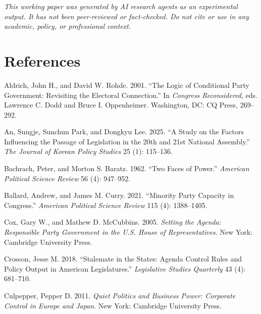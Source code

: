 \documentclass[11pt]{article}
\begin{document}
\bigskip
\noindent\textit{This working paper was generated by AI research agents as an
experimental output. It has not been peer-reviewed or fact-checked.
Do not cite or use in any academic, policy, or professional context.}


\section*{References}

\begin{description}

\item Aldrich, John H., and David W. Rohde. 2001. ``The Logic of Conditional Party Government: Revisiting the Electoral Connection.'' In \textit{Congress Reconsidered}, eds. Lawrence C. Dodd and Bruce I. Oppenheimer. Washington, DC: CQ Press, 269--292.

\item An, Sungje, Sunchun Park, and Dongkyu Lee. 2025. ``A Study on the Factors Influencing the Passage of Legislation in the 20th and 21st National Assembly.'' \textit{The Journal of Korean Policy Studies} 25 (1): 115--136.

\item Bachrach, Peter, and Morton S. Baratz. 1962. ``Two Faces of Power.'' \textit{American Political Science Review} 56 (4): 947--952.

\item Ballard, Andrew, and James M. Curry. 2021. ``Minority Party Capacity in Congress.'' \textit{American Political Science Review} 115 (4): 1388--1405.

\item Cox, Gary W., and Mathew D. McCubbins. 2005. \textit{Setting the Agenda: Responsible Party Government in the U.S. House of Representatives}. New York: Cambridge University Press.

\item Crosson, Jesse M. 2018. ``Stalemate in the States: Agenda Control Rules and Policy Output in American Legislatures.'' \textit{Legislative Studies Quarterly} 43 (4): 681--710.

\item Culpepper, Pepper D. 2011. \textit{Quiet Politics and Business Power: Corporate Control in Europe and Japan}. New York: Cambridge University Press.


\end{description}
\end{document}
